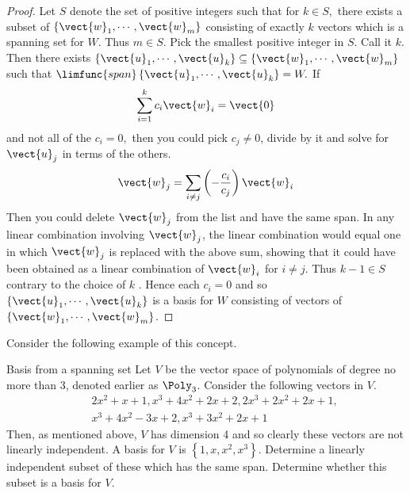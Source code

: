 \begin{proof}
Let $S$ denote the set of positive integers such that for $
k\in S,$ there exists a subset of $\left\{ \vect{w}_{1},\cdots ,\vect{w}
_{m}\right\} $ consisting of exactly $k$ vectors which is a spanning set for 
$W$. Thus $m\in S$. Pick the smallest positive integer in $S$. Call it $k$.
Then there exists $\left\{ \vect{u}_{1},\cdots ,\vect{u}_{k}\right\} \subseteq
\left\{ \vect{w}_{1},\cdots ,\vect{w}_{m}\right\} $ such that $\limfunc{span}
\left\{ \vect{u}_{1},\cdots ,\vect{u}_{k}\right\} =W.$ If 
\begin{equation*}
\sum_{i=1}^{k}c_{i}\vect{w}_{i}=\vect{0}
\end{equation*}
and not all of the $c_{i}=0,$ then you could pick $c_{j}\neq 0$, divide by
it and solve for $\vect{u}_{j}$ in terms of the others. 
\begin{equation*}
\vect{w}_{j}=\sum_{i\neq j}\left( -\frac{c_{i}}{c_{j}}\right) \vect{w}_{i}
\end{equation*}
Then you could delete $\vect{w}_{j}$ from the list and have the same span.
In any linear combination involving $\vect{w}_{j}$, the linear
combination would equal one in which $\vect{w}_{j}$ is replaced with the
above sum, showing that it could have been obtained as a linear combination
of $\vect{w}_{i}$ for $i\neq j$. Thus $k-1\in S$ contrary to the choice of $k$
. Hence each $c_{i}=0$ and so $\left\{ \vect{u}_{1},\cdots ,\vect{u}
_{k}\right\} $ is a basis for $W$ consisting of vectors of $\left\{ \vect{w}
_{1},\cdots ,\vect{w}_{m}\right\} $. 
\end{proof}

Consider the following example of this concept. 

\begin{example}{Basis from a spanning set}{}
Let $V$ be the vector space of polynomials of degree no more than 3,
denoted earlier as $\Poly_{3}$. Consider the following vectors in $V$.
\begin{eqnarray*}
&&2x^{2}+x+1,x^{3}+4x^{2}+2x+2,2x^{3}+2x^{2}+2x+1, \\
&&x^{3}+4x^{2}-3x+2,x^{3}+3x^{2}+2x+1
\end{eqnarray*}
Then, as mentioned above, $V$ has dimension 4 and so clearly these vectors
are not linearly independent. A basis for $V$ is $\left\{
1,x,x^{2},x^{3}\right\} $. Determine a linearly independent subset of these
which has the same span. Determine whether this subset is a basis for $V$.
\end{example}

